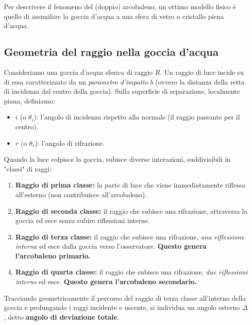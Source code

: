 \documentclass[openany,a4paper,12pt]{book}
\begin{document}
Per descrivere il fenomeno del (doppio) arcobaleno, un ottimo modello fisico è quello di assimilare la goccia d'acqua a una sfera di vetro o cristallo piena d'acqua.

\subsection*{Geometria del raggio nella goccia d'acqua}
Consideriamo una goccia d'acqua sferica di raggio $R$. Un raggio di luce incide su di essa caratterizzato da un \textit{parametro d'impatto} $b$ (ovvero la distanza della retta di incidenza dal centro della goccia). Sulla superficie di separazione, localmente piana, definiamo:
\begin{itemize}
    \item $i$ (o $\theta_i$): l'angolo di incidenza rispetto alla normale (il raggio passante per il centro).
    \item $r$ (o $\theta_r$): l'angolo di rifrazione.
\end{itemize}
Quando la luce colpisce la goccia, subisce diverse interazioni, suddivisibili in "classi" di raggi:
\begin{enumerate}
    \item \textbf{Raggio di prima classe:} la parte di luce che viene immediatamente riflessa all'esterno (non contribuisce all'arcobaleno).
    \item \textbf{Raggio di seconda classe:} il raggio che subisce una rifrazione, attraversa la goccia ed esce senza subire riflessioni interne.
    \item \textbf{Raggio di terza classe:} il raggio che subisce una rifrazione, \textit{una riflessione interna} ed esce dalla goccia verso l'osservatore. \textbf{Questo genera l'arcobaleno primario.}
    \item \textbf{Raggio di quarta classe:} il raggio che subisce una rifrazione, \textit{due riflessioni interne} ed esce. \textbf{Questo genera l'arcobaleno secondario.}
\end{enumerate}

Tracciando geometricamente il percorso del raggio di terza classe all'interno della goccia e prolungando i raggi incidente e uscente, si individua un angolo esterno $\Delta$, detto \textbf{angolo di deviazione totale}.
\end{document}
